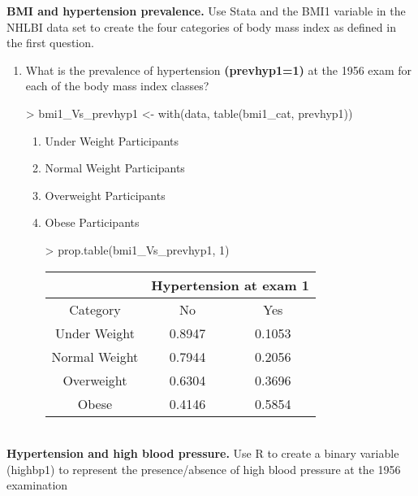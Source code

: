 \documentclass{article}
\begin{document}
\pagebreak
\textbf{BMI and hypertension prevalence.} Use Stata and the BMI1 variable in the NHLBI data set to create the four categories of body mass index as defined in the first question.\\ 

\begin{enumerate}
  \item What is the prevalence of hypertension \textbf{(prevhyp1=1)} at the 1956 exam for each of the body mass index classes?

\begin{Schunk}
\begin{Sinput}
> bmi1_Vs_prevhyp1 <- with(data, table(bmi1_cat, prevhyp1))
\end{Sinput}
\end{Schunk}

\begin{enumerate}
  \item Under Weight Participants
  \item Normal Weight Participants
  \item Overweight Participants
  \item Obese Participants

\begin{Schunk}
\begin{Sinput}
> prop.table(bmi1_Vs_prevhyp1, 1)
\end{Sinput}
\end{Schunk}
\begin{table}[ht]
\begin{center}
\begin{tabular}{ccc}
& \multicolumn{2}{c}{Hypertension at exam 1}\\
  \hline
Category & No & Yes \\ 
  \hline
Under Weight & 0.8947 & 0.1053 \\ 
Normal Weight & 0.7944 & 0.2056 \\ 
Overweight & 0.6304 & 0.3696 \\ 
Obese & 0.4146 & 0.5854 \\ 
   \hline
\end{tabular}
\end{center}
\end{table}

\end{enumerate}
\end{enumerate}\\

\pagebreak
\textbf{Hypertension and high blood pressure.} Use R to create a binary variable (highbp1) to represent the presence/absence of high blood pressure at the 1956 examination
\end{document}
